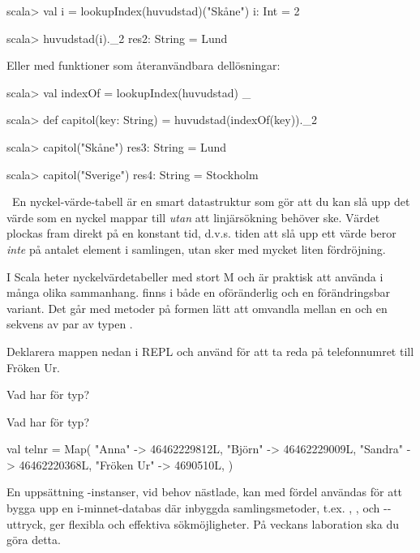 \SubtaskSolved
\begin{REPL}
scala> val i = lookupIndex(huvudstad)("Skåne")
i: Int = 2

scala> huvudstad(i)._2
res2: String = Lund
\end{REPL}

\noindent Eller med funktioner som återanvändbara dellösningar:
\begin{REPL}
scala> val indexOf = lookupIndex(huvudstad) _

scala> def capitol(key: String) = huvudstad(indexOf(key))._2

scala> capitol("Skåne")
res3: String = Lund

scala> capitol("Sverige")
res4: String = Stockholm
\end{REPL}

\QUESTEND




\QUESTBEGIN

\Task \what~En nyckel-värde-tabell är en smart datastruktur som gör att du kan slå upp det värde som en nyckel mappar till \emph{utan} att linjärsökning behöver ske. Värdet plockas fram direkt på en konstant tid, d.v.s. tiden att slå upp ett värde beror \emph{inte} på antalet element i samlingen, utan sker med mycket liten fördröjning.

I Scala heter nyckelvärdetabeller  med stort M och är praktisk att använda i många olika sammanhang.  finns i både en oföränderlig och en förändringsbar variant. Det går med metoder på formen  lätt att omvandla mellan en  och en sekvens av par av typen .

\Subtask Deklarera mappen  nedan i REPL och använd  för att ta reda på telefonnumret till Fröken Ur.

\Subtask Vad har  för typ?

\Subtask Vad har  för typ?

\begin{Code}
val telnr = Map(
  "Anna"     -> 46462229812L,
  "Björn"     -> 46462229009L,
  "Sandra"    -> 46462220368L,
  "Fröken Ur" -> 4690510L,
)
\end{Code}
En uppsättning -instanser, vid behov nästlade, kan med fördel användas för att bygga upp en i-minnet-databas där inbyggda samlingsmetoder, t.ex. , , och --uttryck, ger flexibla och effektiva sökmöjligheter. På veckans laboration ska du göra detta.

